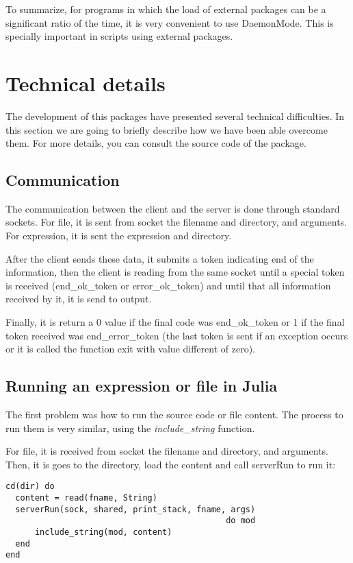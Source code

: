\documentclass{juliacon}
\begin{document}
To summarize, for programs in which the load of external packages can be a
significant ratio of the time, it is very convenient to use DaemonMode. This is
specially important in scripts using external packages.

\section{Technical details}
\label{sec:details}

The development of this packages have presented several technical difficulties.
In this section we are going to briefly describe how we have been able overcome
them. For more details, you can consult the source code of the package.

\subsection{Communication}

The communication between the client and the server is done through standard
sockets. For file, it is sent from socket the filename and directory, and
arguments.  For expression, it is sent the expression and directory.

After the client sends these data, it submits a token indicating end of the
information, then the client is reading from the same socket until a special
token is received (end\_ok\_token  or error\_ok\_token) and until that all
information received by it, it is send to output.

Finally, it is return a 0 value if the final code was end\_ok\_token or 1 if the
final token received was end\_error\_token (the last token is sent if an
exception occurs or it is called the function exit with value different of zero).

\subsection{Running an expression or file in Julia}

The first problem was how to run the source code or file content. The process to
run them is very similar, using the \textit{include\_string} function.

For file, it is received from socket the filename and directory, and arguments. Then, it is
goes to the directory, load the content and call serverRun to run it:

\begin{lstlisting}
cd(dir) do
  content = read(fname, String)
  serverRun(sock, shared, print_stack, fname, args) 
                                             do mod
      include_string(mod, content)
  end
end
\end{lstlisting}
\end{document}
